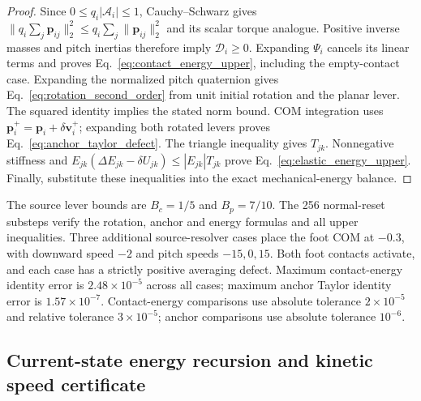 \begin{proof}
Since $0\le q_i|\mathcal A_i|\le1$, Cauchy--Schwarz gives
$\|q_i\sum_j\mathbf p_{ij}\|_2^2\le q_i\sum_j\|\mathbf p_{ij}\|_2^2$ and its scalar torque analogue.
Positive inverse masses and pitch inertias therefore imply $\mathcal D_i\ge0$.
Expanding $\Psi_i$ cancels its linear terms and proves Eq.~\eqref{eq:contact_energy_upper}, including the empty-contact case.
Expanding the normalized pitch quaternion gives Eq.~\eqref{eq:rotation_second_order} from unit initial rotation and the planar lever.
The squared identity implies the stated norm bound.
COM integration uses $\mathbf p_i^+=\mathbf p_i+\delta\mathbf v_i^+$; expanding both rotated levers proves Eq.~\eqref{eq:anchor_taylor_defect}.
The triangle inequality gives $T_{jk}$.
Nonnegative stiffness and $E_{jk}(\Delta E_{jk}-\delta U_{jk})\le|E_{jk}|T_{jk}$ prove Eq.~\eqref{eq:elastic_energy_upper}.
Finally, substitute these inequalities into the exact mechanical-energy balance.
\end{proof}

The source lever bounds are $B_c=1/5$ and $B_p=7/10$.
The 256 normal-reset substeps verify the rotation, anchor and energy formulas and all upper inequalities.
Three additional source-resolver cases place the foot COM at $-0.3$, with downward speed $-2$ and pitch speeds $-15,0,15$.
Both foot contacts activate, and each case has a strictly positive averaging defect.
Maximum contact-energy identity error is $2.48\times10^{-5}$ across all cases; maximum anchor Taylor identity error is $1.57\times10^{-7}$.
Contact-energy comparisons use absolute tolerance $2\times10^{-5}$ and relative tolerance $3\times10^{-5}$; anchor comparisons use absolute tolerance $10^{-6}$.

\subsection{Current-state energy recursion and kinetic speed certificate}
\label{app:current_energy}

